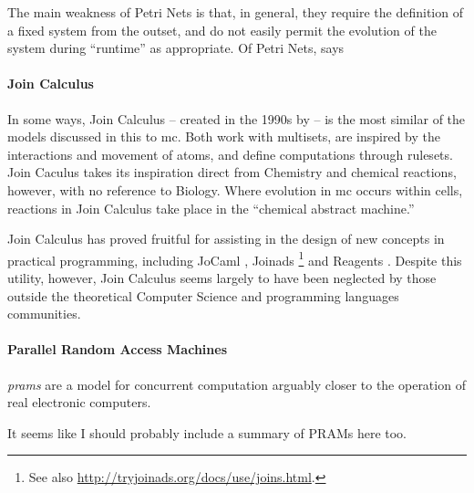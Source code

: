 The main weakness of Petri Nets is that, in general, they require the definition of a fixed system from the outset, and do not easily permit the evolution of the system during ``runtime'' as appropriate.  Of Petri Nets, \citeauthor{Varela2013} says 

\paragraph{Join Calculus}
In some ways, Join Calculus -- created in the 1990s by \citeauthor{Fournet1996} \cite{Fournet1996,Fournet2002} -- is the most similar of the models discussed in this  to \gls{mc}.  Both work with multisets, are inspired by the interactions and movement of atoms, and define computations through rulesets.  Join Caculus takes its inspiration direct from Chemistry and chemical reactions, however, with no reference to Biology.  Where evolution in \gls{mc} occurs within cells, reactions in Join Calculus take place in the ``chemical abstract machine.''

Join Calculus has proved fruitful for assisting in the design of new concepts in practical programming, including JoCaml \cite{Fournet2003}, Joinads \cite{Petricek2011}\footnote{See also \url{http://tryjoinads.org/docs/use/joins.html}.} and Reagents \cite{Turon2012}.  Despite this utility, however, Join Calculus seems largely to have been neglected by those outside the theoretical Computer Science and programming languages communities.

\paragraph{\label{sec:lr:pram}Parallel Random Access Machines}

\emph{\Glspl{pram}} are a model for concurrent computation arguably closer to the operation of real electronic computers.  

\begin{anfxnote}
It seems like I should probably include a summary of PRAMs here too.
\end{anfxnote}